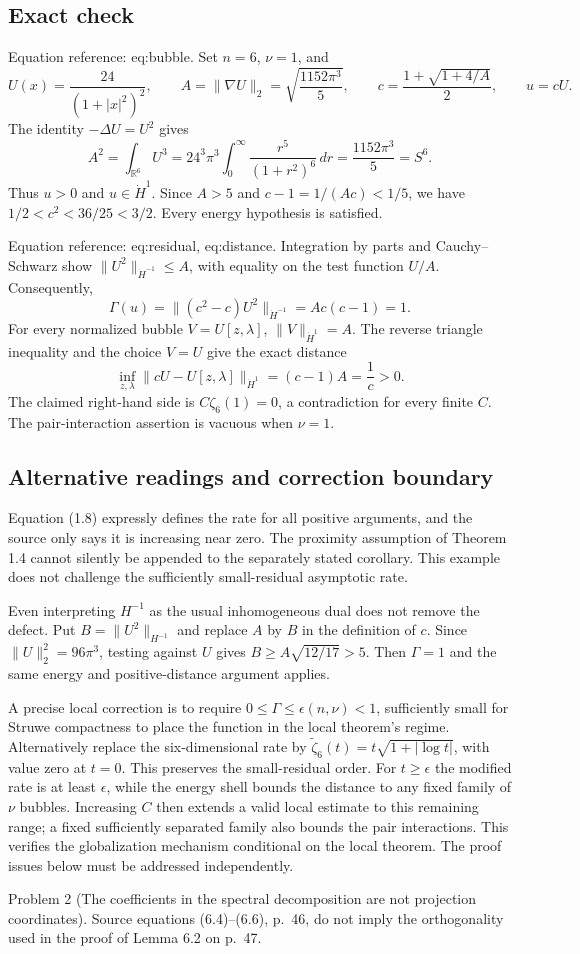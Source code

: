 \documentclass[10pt]{article}
\begin{document}
\subsection*{Exact check}
Equation reference: eq:bubble. Set \(n=6\), \(\nu=1\), and \[
 U(x)=\frac{24}{(1+|x|^2)^2},\qquad
 A=\|\nabla U\|_2=\sqrt{\frac{1152\pi^3}{5}},\qquad
 c=\frac{1+\sqrt{1+4/A}}2,\qquad u=cU.\] The identity \(-\Delta U=U^2\) gives \[A^2=\int_{\mathbb R^6}U^3
 =24^3\pi^3\int_0^\infty\frac{r^5}{(1+r^2)^6}\,dr
 =\frac{1152\pi^3}{5}=S^6.\] Thus \(u>0\) and \(u\in\dot H^1\). Since \(A>5\) and \(c-1=1/(Ac)<1/5\), we have \(1/2<c^2<36/25<3/2\). Every energy hypothesis is satisfied.\par
Equation reference: eq:residual, eq:distance. Integration by parts and Cauchy–Schwarz show \(\|U^2\|_{\dot H^{-1}}\le A\), with equality on the test function \(U/A\). Consequently, \[
 \Gamma(u)=\|(c^2-c)U^2\|_{\dot H^{-1}}=Ac(c-1)=1.\] For every normalized bubble \(V=U[z,\lambda]\), \(\|V\|_{\dot H^1}=A\). The reverse triangle inequality and the choice \(V=U\) give the exact distance \[
 \inf_{z,\lambda}\|cU-U[z,\lambda]\|_{\dot H^1}=(c-1)A=\frac1c>0.\] The claimed right-hand side is \(C\zeta_6(1)=0\), a contradiction for every finite \(C\). The pair-interaction assertion is vacuous when \(\nu=1\).\par
\subsection*{Alternative readings and correction boundary}
Equation (1.8) expressly defines the rate for all positive arguments, and the source only says it is increasing near zero. The proximity assumption of Theorem 1.4 cannot silently be appended to the separately stated corollary. This example does not challenge the sufficiently small-residual asymptotic rate.\par
Even interpreting \(H^{-1}\) as the usual inhomogeneous dual does not remove the defect. Put \(B=\|U^2\|_{H^{-1}}\) and replace \(A\) by \(B\) in the definition of \(c\). Since \(\|U\|_2^2=96\pi^3\), testing against \(U\) gives \(B\ge A\sqrt{12/17}>5\). Then \(\Gamma=1\) and the same energy and positive-distance argument applies.\par
A precise local correction is to require \(0\le\Gamma\le\epsilon(n,\nu)<1\), sufficiently small for Struwe compactness to place the function in the local theorem’s regime. Alternatively replace the six-dimensional rate by \(\widetilde\zeta_6(t)=t\sqrt{1+|\log t|}\), with value zero at \(t=0\). This preserves the small-residual order. For \(t\ge\epsilon\) the modified rate is at least \(\epsilon\), while the energy shell bounds the distance to any fixed family of \(\nu\) bubbles. Increasing \(C\) then extends a valid local estimate to this remaining range; a fixed sufficiently separated family also bounds the pair interactions. This verifies the globalization mechanism conditional on the local theorem. The proof issues below must be addressed independently.\par
Problem 2 (The coefficients in the spectral decomposition are not projection coordinates).  Source equations (6.4)–(6.6), p. 46, do not imply the orthogonality used in the proof of Lemma 6.2 on p. 47.\par
\end{document}
